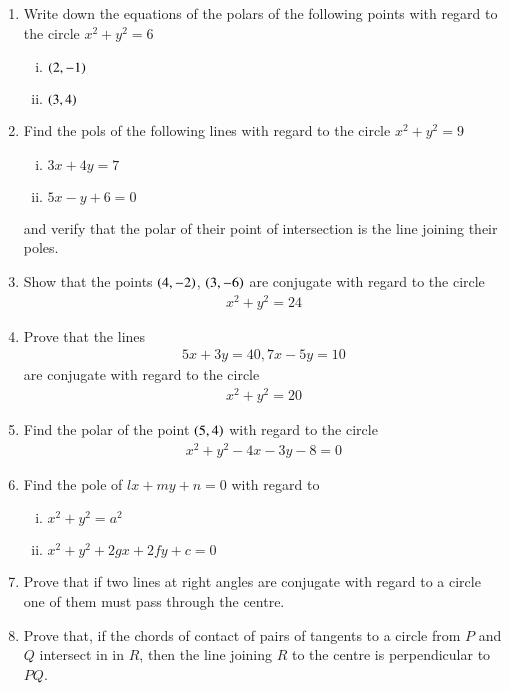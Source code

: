 \begin{enumerate}[1.]
\item Write down the equations of the polars of the following points with regard to the circle $x^2+y^2=6$
\begin{multicols}{2}
\begin{enumerate}[(i)]
\item
$
\left(2,-1\right)
$
\item
$
\left(3,4\right)
$
\end{enumerate}
\end{multicols}
\item Find the pols of the following lines with regard to the circle $x^2+y^2=9$
\begin{enumerate}[(i)]
\item
$
3x+4y=7
$
\item
$
5x-y+6=0
$
\end{enumerate}
and verify that the polar of their point of intersection is the line joining their poles.
\item Show that the points $\left(4,-2\right)$, $\left(3,-6\right)$ are conjugate with regard to the circle
\begin{align*}
x^2+y^2= 24
\end{align*}
\item Prove that the lines 
\begin{align*}
5x+3y=40, 7x-5y= 10
\end{align*}
are conjugate with regard to the circle
\begin{align*}
x^2+y^2=20
\end{align*}
\item Find the polar of the point $\left(5,4\right)$ with regard to the circle
\begin{align*}
x^2+y^2-4x-3y-8=0
\end{align*}
\item Find the pole of $lx+my+n=0$ with regard to
\begin{enumerate}[(i)]
\item
$
x^2+y^2 = a^2
$
\item
$
x^2+y^2+2gx+2fy+c = 0
$

\end{enumerate}
\item Prove that if two lines at right angles are conjugate with regard to a circle one of them must pass through the centre.
\item Prove that, if the chords of contact of pairs of tangents to a circle from $P$ and $Q$ intersect in in $R$, then the line joining $R$ to
the centre is perpendicular to $PQ$.
\end{enumerate}